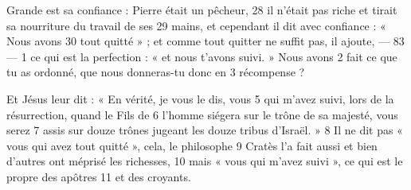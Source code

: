 Grande est sa confiance : Pierre était un pêcheur,	 
28	 	il n'était pas riche et tirait sa nourriture du travail de ses	 
29	 	mains, et cependant il dit avec confiance : « Nous avons	 
30	 	tout quitté » ; et comme tout quitter ne suffit pas, il ajoute,	 
 	--- 83 ---	 
1	 	ce qui est la perfection : « et nous t'avons suivi. » Nous avons	 
2	 	fait ce que tu as ordonné, que nous donneras-tu donc en	 
3	 	récompense ?

Et Jésus leur dit : « En vérité, je vous le dis, vous	 
5	 	qui m'avez suivi, lors de la résurrection, quand le Fils de	 
6	 	l'homme siégera sur le trône de sa majesté, vous serez	 
7	 	assis sur douze trônes jugeant les douze tribus d'Israël. »	 
8	 	Il ne dit pas « vous qui avez tout quitté », cela, le philosophe	 
9	 	Cratès l'a fait aussi et bien d'autres ont méprisé les richesses,	 
10	 	mais « vous qui m'avez suivi », ce qui est le propre des apôtres	 
11	 	et des croyants.
